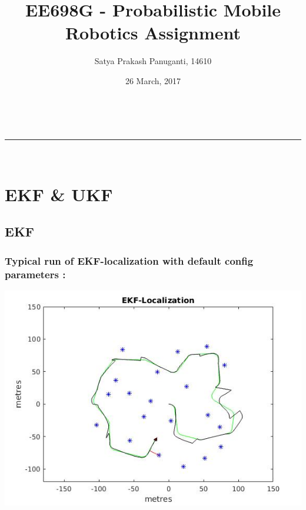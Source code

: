 \documentclass[a4paper,fleqn,11pt]{article}
\makeatletter
\newcommand{\linia}{\rule{\linewidth}{0.5pt}}
\theoremstyle{mytheor}
\renewcommand{\maketitle}{
\begin{center}
\vspace{2ex}
{\huge \textsc{\@title}}
\vspace{1ex}
\\
\linia\\
\@author \hfill \@date
\vspace{4ex}
\end{center}
}
\makeatother
\begin{document}
\title{EE698G - Probabilistic Mobile Robotics Assignment}

\author{Satya Prakash Panuganti, 14610}

\date{26 March, 2017}

\maketitle

\section{EKF \& UKF}

\subsection{EKF}

\subsubsection{Typical run of EKF-localization with default config parameters :}

\begin{center}
\includegraphics[scale = 0.74]{../images/EKF-default1.jpg} \\
\end{center}
\end{document}
